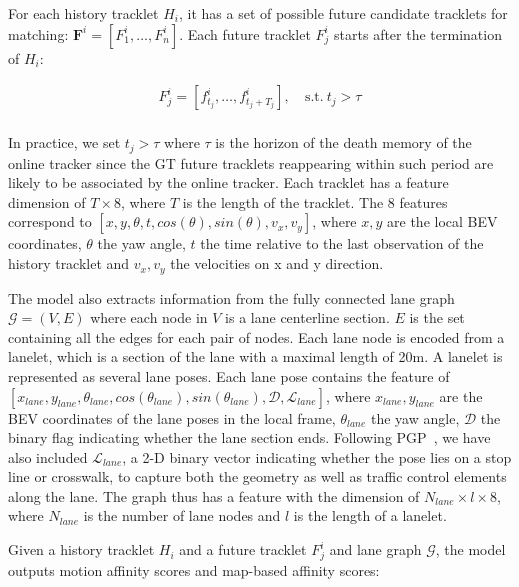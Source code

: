 \documentclass{article} \usepackage{iclr2023_conference,times}
\begin{document}
For each history tracklet $H_{i}$, it has a set of possible future candidate tracklets for matching: $\mathbf{F}^{i}=\left[F^{i}_{1}, \ldots, F^{i}_{n}\right]$. Each future tracklet $F^{i}_{j}$ starts after the termination of $H_{i}$: 

\begin{equation}\label{eq:future candidate constraints}
\begin{aligned}
    F^{i}_{j}=\left[ f^{i}_{t_j}, \ldots, f^{i}_{t_j+T_{j}}\right], \   &  \text{s.t.} \ t_j>\tau \\
\end{aligned}
\end{equation}

In practice, we set $t_j > \tau$ where $\tau$ is the horizon of the death memory of the online tracker since the GT future tracklets reappearing within such period are likely to be associated by the online tracker. Each tracklet has a feature dimension of $T \times 8$, where $T$ is the length of the tracklet. The 8 features correspond to $\left[x, y, \theta, t, cos(\theta), sin(\theta),v_x,v_y\right] $, where $x,y$ are the local BEV coordinates, $\theta$ the yaw angle, $t$ the time relative to the last observation of the history tracklet and $v_x,v_y$ the velocities on x and y direction.

The model also extracts information from the fully connected lane graph $\mathcal{G}=(V, E)$ where each node in $V$ is a lane centerline section. $E$ is the set containing all the edges for each pair of nodes. Each lane node is encoded from a lanelet, which is a section of the lane with a maximal length of 20m. A lanelet is represented as several lane poses. Each lane pose contains the feature of $\left[x_{lane}, y_{lane}, \theta_{lane}, cos(\theta_{lane}), sin(\theta_{lane}), \mathcal{D},\mathcal{L}_{lane}\right]$, where $x_{lane}, y_{lane}$ are the BEV coordinates of the lane poses in the local frame, $\theta_{lane}$ the yaw angle, $\mathcal{D}$ the binary flag indicating whether the lane section ends. Following PGP~\cite{PGP}, we have also included $\mathcal{L}_{lane}$, a 2-D binary vector indicating whether the pose lies on a stop line or crosswalk, to capture both the geometry as well as traffic control elements along the lane. The graph thus has a feature with the dimension of $N_{lane}\times l\times 8$, where $N_{lane}$ is the number of lane nodes and $l$ is the length of a lanelet. 

Given a history tracklet $H_{i}$ and a future tracklet $F^{i}_{j}$ and lane graph $\mathcal{G}$, the model outputs motion affinity scores and map-based affinity scores:
\end{document}
